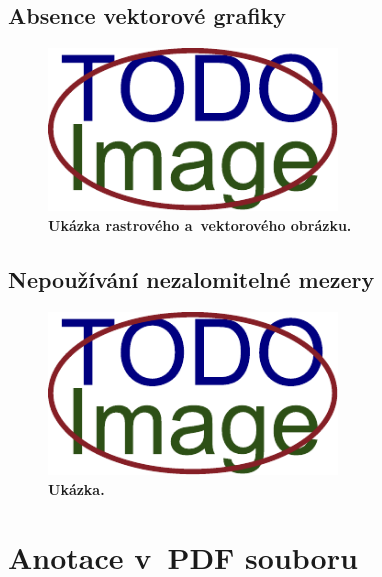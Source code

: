 \section{Absence vektorové grafiky}
\dummyShortText[10]
\begin{figure}[H]
    \centering
    \includegraphics[width=\linewidth,height=1.7in]{obrazky-figures/placeholder.pdf}
    \caption{\textbf{Ukázka rastrového a~vektorového obrázku.} }
\end{figure}


\section{Nepoužívání nezalomitelné mezery}
\dummyText
\begin{figure}[H]
    \centering
    \includegraphics[width=\linewidth,height=1.7in]{obrazky-figures/placeholder.pdf}
    \caption{\textbf{Ukázka.} }
\end{figure}






\chapter{Anotace v~PDF souboru}

